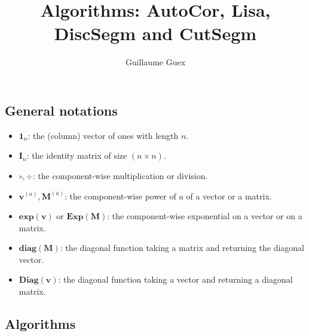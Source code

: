 \documentclass[11p]{article}
\title{Algorithms: AutoCor, Lisa, DiscSegm and CutSegm}
\author{Guillaume Guex}
\begin{document}
	
\maketitle
	
\subsection*{General notations}

\begin{itemize}
	\item $\mathbf{1}_n$: the (column) vector of ones with length $n$.
	\item $\mathbf{I}_n$: the identity matrix of size $(n \times n)$.
	\item $\circ, \div$: the component-wise multiplication or division.
	\item $\mathbf{v}^{(a)}, \mathbf{M}^{(a)}$: the component-wise power of $a$ of a vector or a matrix.
	\item $\mathbf{exp}(\mathbf{v})$ or $\mathbf{Exp}(\mathbf{M})$: the component-wise exponential on a vector or on a matrix.
	\item $\mathbf{diag}(\mathbf{M})$: the diagonal function taking a matrix and returning the diagonal vector.
	\item $\mathbf{Diag}(\mathbf{v})$: the diagonal function taking a vector and returning a diagonal matrix.
\end{itemize}

\subsection*{Algorithms}

\end{document}
